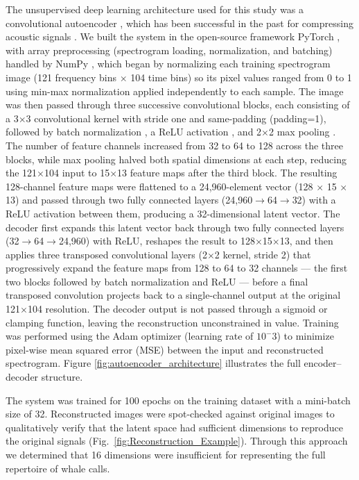 \documentclass[preprint,NumberedRefs]{JASAnew}
\begin{document}
The unsupervised deep learning architecture used for this study was a convolutional autoencoder \cite{hinton2006reducing}, which has been successful in the past for compressing acoustic signals \cite{ozanich2021deep,chien2023automatic}. We built the system in the open-source framework PyTorch \cite{paszke2019pytorch}, with array preprocessing (spectrogram loading, normalization, and batching) handled by NumPy \cite{harris2020array}, which began by normalizing each training spectrogram image (121 frequency bins $\times$ 104 time bins) so its pixel values ranged from 0 to 1 using min-max normalization applied independently to each sample. The image was then passed through three successive convolutional blocks, each consisting of a 3$\times$3 convolutional kernel with stride one and same-padding (padding=1), followed by batch normalization \cite{ioffe2015batch}, a ReLU activation \cite{nair2010rectified}, and 2$\times$2 max pooling \cite{lecun1998gradient}. The number of feature channels increased from 32 to 64 to 128 across the three blocks, while max pooling halved both spatial dimensions at each step, reducing the 121$\times$104 input to 15$\times$13 feature maps after the third block. The resulting 128-channel feature maps were flattened to a 24,960-element vector (128 $\times$ 15 $\times$ 13) and passed through two fully connected layers (24,960$\to$64$\to$32) with a ReLU activation between them, producing a 32-dimensional latent vector. The decoder first expands this latent vector back through two fully connected layers (32$\to$64$\to$24,960) with ReLU, reshapes the result to 128$\times$15$\times$13, and then applies three transposed convolutional layers (2$\times$2 kernel, stride 2) that progressively expand the feature maps from 128 to 64 to 32 channels — the first two blocks followed by batch normalization and ReLU — before a final transposed convolution projects back to a single-channel output at the original 121$\times$104 resolution. The decoder output is not passed through a sigmoid or clamping function, leaving the reconstruction unconstrained in value. Training was performed using the Adam optimizer \cite{kingma2015adam} (learning rate of $10^-3$) to minimize pixel-wise mean squared error (MSE) between the input and reconstructed spectrogram. Figure \ref{fig:autoencoder_architecture} illustrates the full encoder–decoder structure.

The system was trained for 100 epochs on the training dataset with a mini-batch size of 32. Reconstructed images were spot-checked against original images to qualitatively verify that the latent space had sufficient dimensions to reproduce the original signals (Fig.~\ref{fig:Reconstruction_Example}). Through this approach we determined that 16 dimensions were insufficient for representing the full repertoire of whale calls. 
\end{document}
